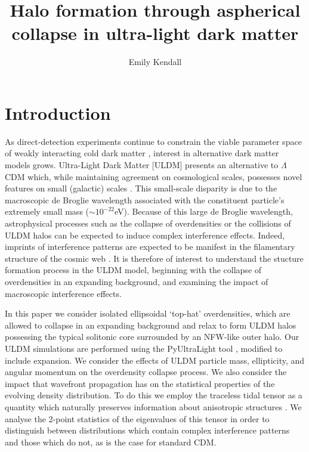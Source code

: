 \documentclass[a4paper,11pt]{article}
\title{\boldmath Halo formation through aspherical collapse in ultra-light dark matter}
\author[a]{Emily Kendall}
\affiliation[a]{The University of Auckland, Private Bag 92019\\
Auckland 1142, New Zealand}
\begin{document}
\maketitle
\flushbottom

\section{Introduction}
\label{sec:intro}


As direct-detection experiments continue to constrain the viable parameter space of weakly interacting cold dark matter \cite{Schumann:2019eaa}, interest in alternative dark matter models grows. Ultra-Light Dark Matter [ULDM] presents an alternative to $\Lambda$CDM which, while maintaining agreement on cosmological scales, possesses novel features on small (galactic) scales \cite{Hui:2016ltb}. This small-scale disparity is due to the macroscopic de Broglie wavelength associated with the constituent particle's extremely small mass ($\sim10^{-22}$eV). Because of this large de Broglie wavelength, astrophysical processes such as the collapse of overdensities or the collisions of ULDM halos can be expected to induce complex interference effects. Indeed, imprints of interference patterns are expected to be manifest in the filamentary structure of the cosmic web \cite{Mocz:2019emo}. It is therefore of interest to understand the stucture formation process in the ULDM model, beginning with the collapse of overdensities in an expanding background, and examining the impact of macroscopic interference effects. 

In this paper we consider isolated ellipsoidal `top-hat' overdensities, which are allowed to collapse in an expanding background and relax to form ULDM halos possessing the typical solitonic core surrounded by an NFW-like outer halo. Our ULDM simulations are performed using the {\sc PyUltraLight} tool \cite{Edwards:2018ccc}, modified to include expansion.
We consider the effects of ULDM particle mass, ellipticity, and angular momentum on the overdensity collapse process. We also consider the impact that wavefront propagation has on the statistical properties of the evolving density distribution. To do this we employ the traceless tidal tensor as a quantity which naturally preserves information about anisotropic structures \cite{Lee:2009uv}. We analyse the 2-point statistics of the eigenvalues of this tensor in order to distinguish between distributions which contain complex interference patterns and those which do not, as is the case for standard CDM.
\end{document}
